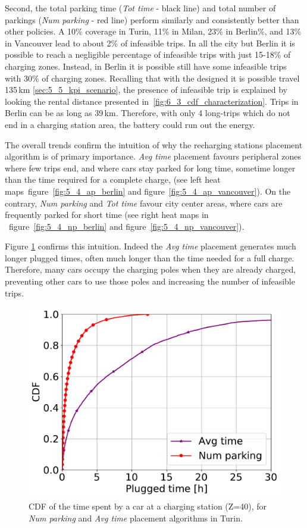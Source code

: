 Second, the total parking time  (\textit{Tot time} - black line) and total number of parkings (\textit{Num parking} - red line) perform similarly and consistently better than other policies. A 10\% coverage in Turin, 11\% in Milan, 23\% in Berlin\%, and 13\% in Vancouver lead to about 2\% of infeasible trips. 
In all the city but Berlin it is possible to reach a negligible percentage of infeasible trips with just 15-18\% of charging zones. Instead, in Berlin it is possible still have some infeasible trips with 30\% of charging zones. Recalling that with the designed it is possible travel 135\,km \ref{sec:5_5_kpi_scenario}, the presence of infeasible trip is explained by looking the rental distance presented in~\ref{fig:6_3_cdf_characterization}. Trips in Berlin can be as long as 39\,km. Therefore, with only 4 long-trips which do not end in a charging station area, the battery could run out the energy.

The overall trends confirm the intuition of why the recharging stations placement algorithm is of primary importance. \textit{Avg time} placement favours peripheral zones where few trips end, and where cars stay parked for long time, sometime longer than the time required for a complete charge, (see left heat maps~figure~\ref{fig:5_4_ap_berlin} and figure~\ref{fig:5_4_ap_vancouver}). On the contrary, \textit{Num parking} and \textit{Tot time} favour city center areas, where cars are frequently parked for short time (see right heat maps in ~figure~\ref{fig:5_4_np_berlin} and figure~\ref{fig:5_4_np_vancouver}). 

Figure \ref{fig:6_6_CDF_parking_time_per_algorithm} confirms this intuition. Indeed the \textit{Avg time} placement generates much longer plugged times, often much longer than the time needed for a full charge. Therefore, many cars occupy the charging poles when they are already charged, preventing other cars to use those poles and increasing the number of infeasible trips. 

\begin{figure}[ht]
	\centering
	\includegraphics[width=0.5\columnwidth]{figures/CDF_parking_time_per_algorithm.pdf}
	\caption{CDF of the time spent by a car at a charging station (Z=40), for \textit{Num parking} and \textit{Avg time} placement algorithms in Turin. }
	\label{fig:6_6_CDF_parking_time_per_algorithm}
\end{figure}



